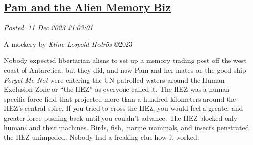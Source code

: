 %

%
%
%

\subsection*{\href{http://analyzethedatanotthedrivel.org/2023/12/11/pam-and-the-alien-memory-biz/}{Pam and the Alien Memory Biz}}


\noindent\emph{Posted: 11 Dec 2023 21:03:01}
\vspace{6pt}

A mockery by \emph{Kline Leopold Hedrös} ©2023

Nobody expected libertarian aliens to set up a memory trading post off
the west coast of Antarctica, but they did, and now Pam and her mates on
the good ship \emph{Forget Me Not} were entering the UN-patrolled waters
around the Human Exclusion Zone or ``the HEZ'' as everyone called it.
The HEZ was a human-specific force field that projected more than a
hundred kilometers around the HEZ's central spire. If you tried to cross
the HEZ, you would feel a greater and greater force pushing back until
you couldn't advance. The HEZ blocked only humans and their machines.
Birds, fish, marine mammals, and insects penetrated the HEZ unimpeded.
Nobody had a freaking clue how it worked.


